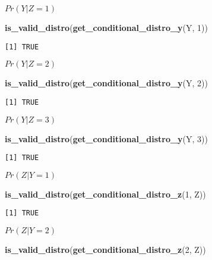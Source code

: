 \documentclass[
]{article}
\newenvironment{Shaded}{\begin{snugshade}}{\end{snugshade}}
\newcommand{\DecValTok}[1]{\textcolor[rgb]{0.00,0.00,0.81}{#1}}
\newcommand{\FunctionTok}[1]{\textcolor[rgb]{0.13,0.29,0.53}{\textbf{#1}}}
\newcommand{\NormalTok}[1]{#1}
\begin{document}
\(Pr(Y | Z=1)\)

\begin{Shaded}
\begin{Highlighting}[]
\FunctionTok{is\_valid\_distro}\NormalTok{(}\FunctionTok{get\_conditional\_distro\_y}\NormalTok{(Y, }\DecValTok{1}\NormalTok{))}
\end{Highlighting}
\end{Shaded}

\begin{verbatim}
[1] TRUE
\end{verbatim}

\(Pr(Y | Z=2)\)

\begin{Shaded}
\begin{Highlighting}[]
\FunctionTok{is\_valid\_distro}\NormalTok{(}\FunctionTok{get\_conditional\_distro\_y}\NormalTok{(Y, }\DecValTok{2}\NormalTok{))}
\end{Highlighting}
\end{Shaded}

\begin{verbatim}
[1] TRUE
\end{verbatim}

\(Pr(Y | Z=3)\)

\begin{Shaded}
\begin{Highlighting}[]
\FunctionTok{is\_valid\_distro}\NormalTok{(}\FunctionTok{get\_conditional\_distro\_y}\NormalTok{(Y, }\DecValTok{3}\NormalTok{))}
\end{Highlighting}
\end{Shaded}

\begin{verbatim}
[1] TRUE
\end{verbatim}

\(Pr(Z | Y=1)\)

\begin{Shaded}
\begin{Highlighting}[]
\FunctionTok{is\_valid\_distro}\NormalTok{(}\FunctionTok{get\_conditional\_distro\_z}\NormalTok{(}\DecValTok{1}\NormalTok{, Z))}
\end{Highlighting}
\end{Shaded}

\begin{verbatim}
[1] TRUE
\end{verbatim}

\(Pr(Z | Y=2)\)

\begin{Shaded}
\begin{Highlighting}[]
\FunctionTok{is\_valid\_distro}\NormalTok{(}\FunctionTok{get\_conditional\_distro\_z}\NormalTok{(}\DecValTok{2}\NormalTok{, Z))}
\end{Highlighting}
\end{Shaded}
\end{document}
